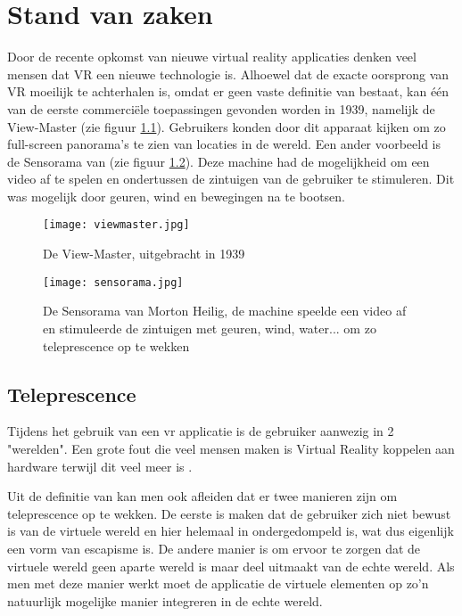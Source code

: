 \chapter{Stand van zaken}
\label{ch:stand-van-zaken}



Door de recente opkomst van nieuwe virtual reality applicaties denken veel mensen dat VR een nieuwe technologie is. Alhoewel dat de exacte oorsprong van VR moeilijk te achterhalen is, omdat er geen vaste definitie van bestaat, kan één van de eerste commerciële toepassingen gevonden worden in 1939, namelijk de View-Master (zie figuur \ref{fig:viewmaster}). Gebruikers konden door dit apparaat kijken om zo full-screen panorama's te zien van locaties in de wereld. Een ander voorbeeld is de Sensorama van \autocite{Heilig1962} (zie figuur \ref{fig:sensorama}). Deze machine had de mogelijkheid om een video af te spelen en ondertussen de zintuigen van de gebruiker te stimuleren. Dit was mogelijk door geuren, wind en bewegingen na te bootsen.
\begin{figure}
    \texttt{[image: viewmaster.jpg]}
    \caption{De View-Master, uitgebracht in 1939}
    \label{fig:viewmaster}
\end{figure}

\begin{figure}
    \texttt{[image: sensorama.jpg]}
    \caption{De Sensorama van Morton Heilig, de machine speelde een video af en stimuleerde de zintuigen met geuren, wind, water... om zo teleprescence op te wekken}
    \label{fig:sensorama}
\end{figure}

\section{Teleprescence}
Tijdens het gebruik van een \acrshort{vr} applicatie is de gebruiker aanwezig in 2 "werelden".
Een grote fout die veel mensen maken is Virtual Reality koppelen aan hardware terwijl dit veel meer is \autocite{Steuer1992}. 

Uit de definitie van \autocite{Steuer1992} kan men ook afleiden dat er twee manieren zijn om teleprescence op te wekken. De eerste is maken dat de gebruiker zich niet bewust is van de virtuele wereld en hier helemaal in ondergedompeld is, wat dus eigenlijk een vorm van escapisme is. De andere manier is om ervoor te zorgen dat de virtuele wereld geen aparte wereld is maar deel uitmaakt van de echte wereld. Als men met deze manier werkt moet de applicatie de virtuele elementen op zo'n natuurlijk mogelijke manier integreren in de echte wereld. 

